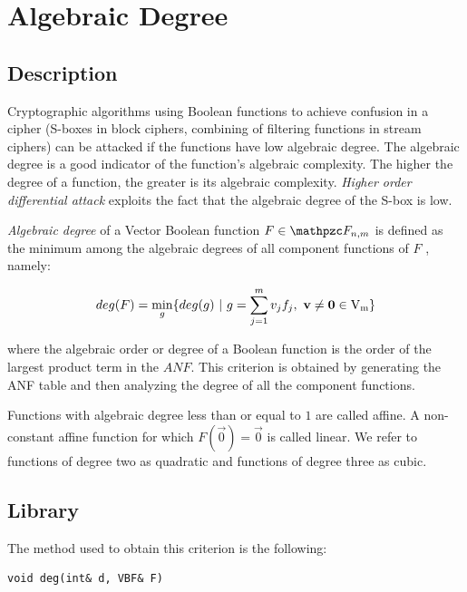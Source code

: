 \section{Algebraic Degree}

\subsection{Description}

Cryptographic algorithms using Boolean functions to achieve confusion in a cipher (S-boxes in block ciphers, combining of filtering functions in stream ciphers) can be attacked if the functions have low algebraic degree. The algebraic degree is a good indicator of the function's algebraic complexity. The higher the degree of a function, the greater is its algebraic complexity. \textit{Higher order differential attack} \cite{Lai:94} exploits the fact that the algebraic degree of the S-box is low.

\begin{definition}
\textit{Algebraic degree} of a Vector Boolean function $F \in \funct{F}_{n,m}$ is defined as the minimum among the algebraic degrees of all component functions of $F$ \cite{Nyberg:92}, namely: 

\begin{equation}
    \crit{deg}(F) = \min_g \{\crit{deg}(g) \given g = \sum_{j=1}^{m} v_jf_j , \  \vec{v}
    \neq \vec{0} \in \gf{V_m} \} 
\end{equation}

where the algebraic order or degree of a Boolean function is the order of the largest product term in the $ANF$. This criterion is obtained by generating the ANF table and then analyzing the degree of all the component functions. 
\end{definition}

Functions with algebraic degree less than or equal to $1$ are called affine. A non-constant affine function for which $F(\vec{0}) = \vec{0}$ is called linear. We refer to functions of degree two as quadratic and functions of degree three as cubic.

\subsection{Library}

The method used to obtain this criterion is the following:

\begin{verbatim}
void deg(int& d, VBF& F)
\end{verbatim}

